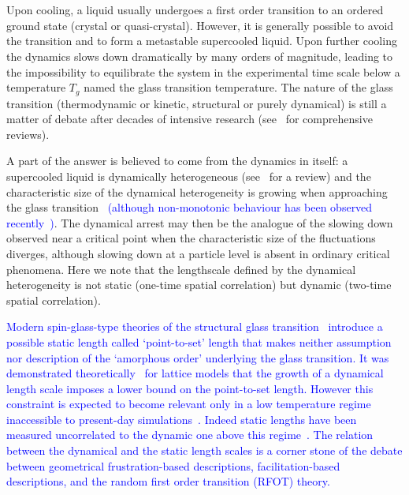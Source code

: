 \section*{}

Upon cooling, a liquid usually undergoes a first order transition to an ordered ground state (crystal or quasi-crystal). However, it is generally possible to avoid the transition and to form a metastable supercooled liquid. Upon further cooling the dynamics slows down dramatically by many orders of magnitude, leading to the impossibility to equilibrate the system in the experimental time scale below a temperature $T_g$ named the glass transition temperature. The nature of the glass transition (thermodynamic or kinetic, structural or purely dynamical) is still a matter of debate after decades of intensive research (see~\citep{cavagna2009supercooled,BerthierR} for comprehensive reviews).

A part of the answer is believed to come from the dynamics in itself: a supercooled liquid is dynamically heterogeneous (see~\citep{BerthierR} for a review) and the characteristic size of the dynamical heterogeneity is growing when approaching the glass transition~\citep{yamamoto1998,Donati1999a} \textcolor{blue}{(although non-monotonic behaviour has been observed recently~\cite{Kob2011})}. The dynamical arrest may then be the analogue of the slowing down observed near a critical point when the characteristic size of the fluctuations diverges, although slowing down at a particle level is absent in ordinary critical phenomena. Here we note that the lengthscale defined by the dynamical heterogeneity is not static (one-time spatial correlation) but dynamic (two-time spatial correlation). 

\textcolor{blue}{Modern spin-glass-type theories of the structural glass transition~\cite{lubchenko2007, Biroli2008, Parisi2010} introduce a possible static length called `point-to-set' length that makes neither assumption nor description of the `amorphous order' underlying the glass transition. It was demonstrated theoretically~\cite{Montanari2006} for lattice models that the growth of a dynamical length scale imposes a lower bound on the point-to-set length. However this constraint is expected to become relevant only in a low temperature regime inaccessible to present-day simulations~\cite{Kob2011}. Indeed static lengths have been measured  uncorrelated to the dynamic one above this regime~\cite{Charbonneau}. The relation between the dynamical and the static length scales is a corner stone of the debate between geometrical frustration-based descriptions, facilitation-based descriptions, and the random first order transition (RFOT) theory.}

